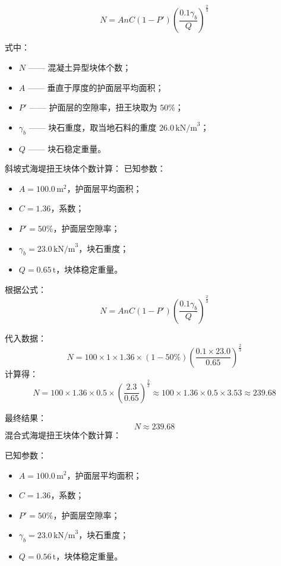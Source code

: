 \documentclass[UTF8, a4paper, 12pt]{ctexart} %
\begin{document}
\begin{equation}
    N = AnC (1 - P') \left( \frac{0.1 \gamma_b}{Q} \right)^{\frac{2}{3}}
\end{equation}

式中：
\begin{itemize}
    \item $N$ —— 混凝土异型块体个数；
    \item $A$ —— 垂直于厚度的护面层平均面积；
    \item $P'$ —— 护面层的空隙率，扭王块取为 $50\%$；
    \item $\gamma_b$ —— 块石重度，取当地石料的重度 $26.0\,\text{kN/m}^3$；
    \item $Q$ —— 块石稳定重量。
\end{itemize}

斜坡式海堤扭王块体个数计算：
已知参数：
\begin{itemize}
    \item $A = 100.0\,\text{m}^2$，护面层平均面积；
    \item $C = 1.36$，系数；
    \item $P' = 50\%$，护面层空隙率；
    \item $\gamma_b = 23.0\,\text{kN/m}^3$，块石重度；
    \item $Q = 0.65\,\text{t}$，块体稳定重量。
\end{itemize}

根据公式：
\begin{equation}
    N = A n C (1 - P') \left( \frac{0.1 \gamma_b}{Q} \right)^{\frac{2}{3}}
\end{equation}

代入数据：
\[
    N = 100 \times 1 \times 1.36 \times (1 - 50\%) \left( \frac{0.1 \times 23.0}{0.65} \right)^{\frac{2}{3}}
\]
计算得：
\[
    N = 100 \times 1.36 \times 0.5 \times \left( \frac{2.3}{0.65} \right)^{\frac{2}{3}} \approx 100 \times 1.36 \times 0.5 \times 3.53 \approx 239.68
\]

最终结果：
\[
N \approx 239.68
\]
混合式海堤扭王块体个数计算：

已知参数：
\begin{itemize}
    \item $A = 100.0\,\text{m}^2$，护面层平均面积；
    \item $C = 1.36$，系数；
    \item $P' = 50\%$，护面层空隙率；
    \item $\gamma_b = 23.0\,\text{kN/m}^3$，块石重度；
    \item $Q = 0.56\,\text{t}$，块体稳定重量。
\end{itemize}
\end{document}
